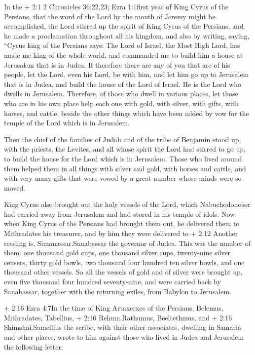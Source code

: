  In the + 2:1 2 Chronicles 36:22,23; Ezra 1:1first year of
King Cyrus of the Persians, that the word of the Lord by the mouth of
Jeremy might be accomplished,  the Lord stirred up the
spirit of King Cyrus of the Persians, and he made a proclamation
throughout all his kingdom, and also by writing,  saying,
``Cyrus king of the Persians says: The Lord of Israel, the Most High
Lord, has made me king of the whole world,  and commanded me
to build him a house at Jerusalem that is in Judea.  If
therefore there are any of you that are of his people, let the Lord,
even his Lord, be with him, and let him go up to Jerusalem that is in
Judea, and build the house of the Lord of Israel. He is the Lord who
dwells in Jerusalem.  Therefore, of those who dwell in
various places, let those who are in his own place help each one with
gold, with silver,  with gifts, with horses, and cattle,
beside the other things which have been added by vow for the temple of
the Lord which is in Jerusalem.

 Then the chief of the families of Judah and of the tribe of
Benjamin stood up, with the priests, the Levites, and all whose spirit
the Lord had stirred to go up, to build the house for the Lord which is
in Jerusalem.  Those who lived around them helped them in
all things with silver and gold, with horses and cattle, and with very
many gifts that were vowed by a great number whose minds were so moved.

 King Cyrus also brought out the holy vessels of the Lord,
which Nabuchodonosor had carried away from Jerusalem and had stored in
his temple of idols.  Now when King Cyrus of the Persians
had brought them out, he delivered them to Mithradates his treasurer,
 and by him they were delivered to + 2:12 Another reading
is, Simanassar.Sanabassar the governor of Judea.  This was
the number of them: one thousand gold cups, one thousand silver cups,
twenty-nine silver censers, thirty gold bowls, two thousand four hundred
ten silver bowls, and one thousand other vessels.  So all
the vessels of gold and of silver were brought up, even five thousand
four hundred seventy-nine,  and were carried back by
Sanabassar, together with the returning exiles, from Babylon to
Jerusalem.

 + 2:16 Ezra 4:7In the time of King Artaxerxes of the
Persians, Belemus, Mithradates, Tabellius, + 2:16 Rehum,Rathumus,
Beeltethmus, and + 2:16 Shimshai.Samellius the scribe, with their other
associates, dwelling in Samaria and other places, wrote to him against
those who lived in Judea and Jerusalem the following letter:

